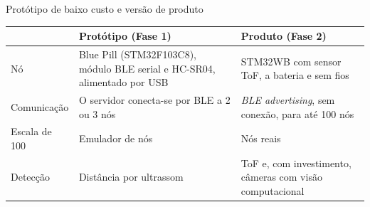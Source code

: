 \documentclass[aspectratio=169,11pt]{beamer}
\begin{document}
\begin{frame}[t]{Protótipo de baixo custo e versão de produto}
  \renewcommand{\arraystretch}{1.35}
  \footnotesize
  \begin{tabular}{@{}p{2.2cm}p{5.4cm}p{5.4cm}@{}}
    \toprule
     & \textbf{Protótipo (Fase 1)} & \textbf{Produto (Fase 2)} \\
    \midrule
    Nó & Blue Pill (STM32F103C8), módulo BLE serial e HC-SR04, alimentado por USB & STM32WB com sensor ToF, a bateria e sem fios \\
    Comunicação & O servidor conecta-se por BLE a 2 ou 3 nós & \emph{BLE advertising}, sem conexão, para até 100 nós \\
    Escala de 100 & Emulador de nós & Nós reais \\
    Detecção & Distância por ultrassom & ToF e, com investimento, câmeras com visão computacional \\
    \bottomrule
  \end{tabular}
\end{frame}
\end{document}
